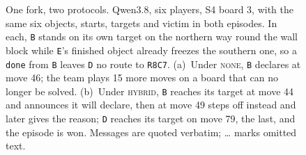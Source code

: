 \begin{figure}[tbp]
    \centering
    \caption{One fork, two protocols. Qwen3.8, six players, S4 board 3, with
    the same six objects, starts, targets and victim in both episodes. In each,
    \texttt{B} stands on its own target on the northern way round the wall
    block while \texttt{E}'s finished object already freezes the southern one,
    so a \texttt{done} from \texttt{B} leaves \texttt{D} no route to
    \texttt{R8C7}. (a)~Under \textsc{none}, \texttt{B} declares at move
    46; the team plays 15 more moves on a board that can no longer
    be solved. (b)~Under \textsc{hybrid}, \texttt{B} reaches its target at
    move 44 and announces it will declare, then at move 49 steps
    off instead and later gives the reason; \texttt{D} reaches its target
    on move 79, the last, and the episode is won. Messages are quoted verbatim;
    \ldots{} marks omitted text.}
    \label{fig:cut-vs-giveway}
\end{figure}

